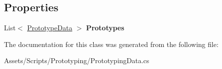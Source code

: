 \subsection*{Properties}
\begin{DoxyCompactItemize}
\item 
\hypertarget{class_hattori_game2_1_1_prototyping_1_1_prototyping_data_a8c52795f1380fa8146143e8cc40d16d5}{}List$<$ \hyperlink{class_hattori_game2_1_1_prototyping_1_1_prototype_data}{Prototype\+Data} $>$ {\bfseries Prototypes}\label{class_hattori_game2_1_1_prototyping_1_1_prototyping_data_a8c52795f1380fa8146143e8cc40d16d5}

\end{DoxyCompactItemize}


The documentation for this class was generated from the following file\+:\begin{DoxyCompactItemize}
\item 
Assets/\+Scripts/\+Prototyping/Prototyping\+Data.\+cs\end{DoxyCompactItemize}
